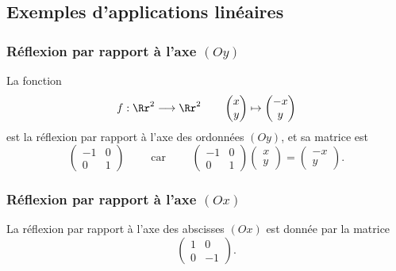 \documentclass[class=report,crop=false]{standalone}
\begin{document}
\subsection{Exemples d'applications linéaires}

\subsubsection{Réflexion par rapport à l'axe $(Oy)$}


La fonction
$$f : \Rr^2 \longrightarrow \Rr^2 \qquad \begin{pmatrix} x \\ y \end{pmatrix} \mapsto \begin{pmatrix} -x \\ y \end{pmatrix}$$
est la réflexion par rapport à l'axe des ordonnées $(Oy)$, et sa matrice est
\[\begin{pmatrix}-1 & 0 \\ 0 & 1 \end{pmatrix}
\qquad \text{ car } \qquad
\begin{pmatrix} -1 & 0 \\ 0 & 1 \end{pmatrix}
\begin{pmatrix} x \\ y \end{pmatrix}
= \begin{pmatrix} -x \\ y \end{pmatrix}.
\]



\subsubsection{Réflexion par rapport à l'axe $(Ox)$}

La réflexion par rapport à l'axe des abscisses $(Ox)$ est donnée par la matrice
\[\begin{pmatrix} 1 & 0\\ 0 & -1 \end{pmatrix}.\]

\end{document}
